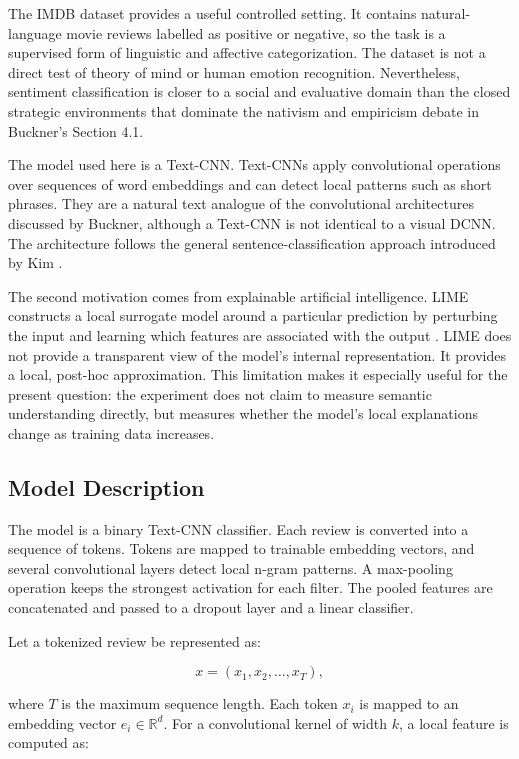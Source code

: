\documentclass[11pt]{article}
\begin{document}
The IMDB dataset provides a useful controlled setting. It contains natural-language movie reviews labelled as positive or negative, so the task is a supervised form of linguistic and affective categorization. The dataset is not a direct test of theory of mind or human emotion recognition. Nevertheless, sentiment classification is closer to a social and evaluative domain than the closed strategic environments that dominate the nativism and empiricism debate in Buckner's Section 4.1.

The model used here is a Text-CNN. Text-CNNs apply convolutional operations over sequences of word embeddings and can detect local patterns such as short phrases. They are a natural text analogue of the convolutional architectures discussed by Buckner, although a Text-CNN is not identical to a visual DCNN. The architecture follows the general sentence-classification approach introduced by Kim \citep{kim2014}.

The second motivation comes from explainable artificial intelligence. LIME constructs a local surrogate model around a particular prediction by perturbing the input and learning which features are associated with the output \citep{ribeiro2016}. LIME does not provide a transparent view of the model's internal representation. It provides a local, post-hoc approximation. This limitation makes it especially useful for the present question: the experiment does not claim to measure semantic understanding directly, but measures whether the model's local explanations change as training data increases.

\subsection{Model Description}

The model is a binary Text-CNN classifier. Each review is converted into a sequence of tokens. Tokens are mapped to trainable embedding vectors, and several convolutional layers detect local n-gram patterns. A max-pooling operation keeps the strongest activation for each filter. The pooled features are concatenated and passed to a dropout layer and a linear classifier.

Let a tokenized review be represented as:

\begin{equation}
x = (x_1, x_2, \ldots, x_T),
\end{equation}

where $T$ is the maximum sequence length. Each token $x_i$ is mapped to an embedding vector $e_i \in \mathbb{R}^{d}$. For a convolutional kernel of width $k$, a local feature is computed as:
\end{document}
